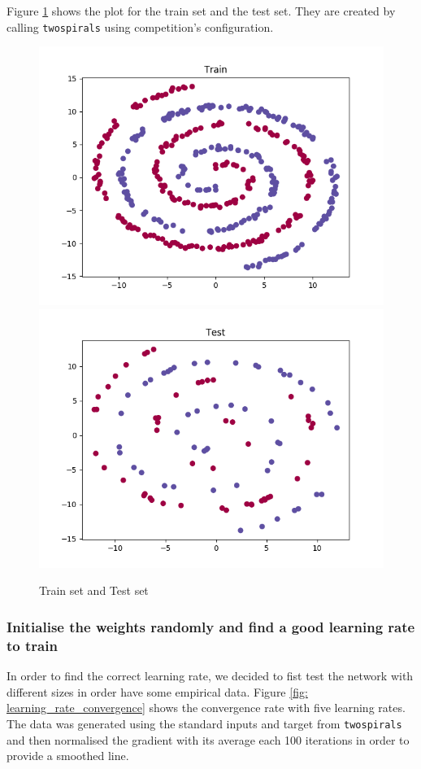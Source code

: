 \documentclass[11pt]{article}
\begin{document}
Figure \ref{fig: train_test_set} shows the plot for the train set and the test set. They are created by calling \texttt{twospirals} using competition's configuration.
\begin{figure}[h]
	\centering
	\includegraphics[scale=0.5]{images/train_set}
	\includegraphics[scale=0.5]{images/test_set}
	\caption{Train set and Test set}
	\label{fig: train_test_set}
\end{figure}


\subsubsection{Initialise the weights randomly and find a good learning rate to train}
In order to find the correct learning rate, we decided to fist test the network with different sizes in order have some empirical data. Figure \ref{fig: learning_rate_convergence} shows the convergence rate with five learning rates. The data was generated using the standard inputs and target from \texttt{twospirals} and then normalised the gradient with its average each 100 iterations in order to provide a smoothed line.
\end{document}
